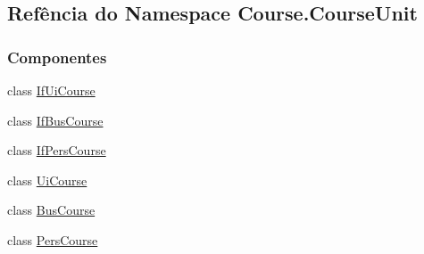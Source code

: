 \hypertarget{namespaceCourse_1_1CourseUnit}{\subsection{Refência do Namespace Course.\-Course\-Unit}
\label{namespaceCourse_1_1CourseUnit}
}
\subsubsection*{Componentes}
\begin{DoxyCompactItemize}
\item 
class \hyperlink{classCourse_1_1CourseUnit_1_1IfUiCourse}{If\-Ui\-Course}
\item 
class \hyperlink{classCourse_1_1CourseUnit_1_1IfBusCourse}{If\-Bus\-Course}
\item 
class \hyperlink{classCourse_1_1CourseUnit_1_1IfPersCourse}{If\-Pers\-Course}
\item 
class \hyperlink{classCourse_1_1CourseUnit_1_1UiCourse}{Ui\-Course}
\item 
class \hyperlink{classCourse_1_1CourseUnit_1_1BusCourse}{Bus\-Course}
\item 
class \hyperlink{classCourse_1_1CourseUnit_1_1PersCourse}{Pers\-Course}
\end{DoxyCompactItemize}
